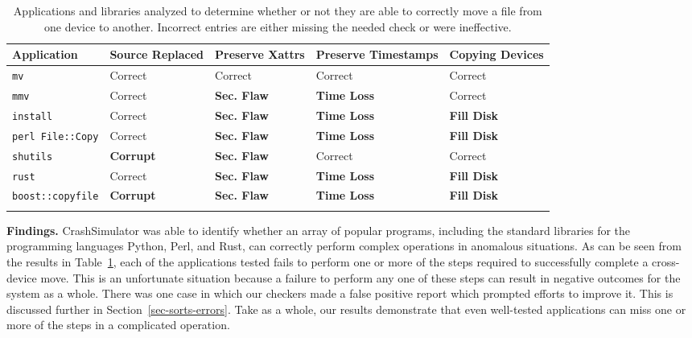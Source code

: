  \begin{table}[t]
    \scriptsize{}
    \begin{tabular}{l p{1cm} p{1cm} p{1.2cm} p{1cm}}
    \toprule{}
        Application     & Source Replaced & Preserve Xattrs & Preserve Timestamps & Copying Devices\\
\hline
        {\tt mv}              & Correct             & Correct         & Correct             & Correct\\
        {\tt mmv}             & Correct             & {\bf Sec. Flaw} & {\bf Time Loss} & Correct\\
        {\tt install}         & Correct             & {\bf Sec. Flaw} & {\bf Time Loss} & {\bf Fill Disk} \\
        {\tt perl File::Copy} & Correct             & {\bf Sec. Flaw} & {\bf Time Loss} & {\bf Fill Disk} \\
        {\tt shutils}         & {\bf Corrupt}	& {\bf Sec. Flaw} 	& Correct             & Correct\\
        {\tt rust}             & Correct             & {\bf Sec. Flaw} & {\bf Time Loss} & {\bf Fill Disk} \\
        {\tt boost::copyfile} & {\bf Corrupt}	      & {\bf Sec. Flaw} & {\bf Time Loss} & {\bf Fill Disk} \\
    \bottomrule{}
    \end{tabular}
    \caption{Applications and libraries analyzed to determine whether or not
      they are able to correctly move a file from one device to another.
Incorrect entries are either missing the needed check or were ineffective.}
    \label{table:crossdevice}
\end{table}

{\bf Findings.}
CrashSimulator was able to identify whether an array of popular programs,
including the standard libraries for the programming languages Python,
Perl,
and Rust,
can correctly perform complex
operations in anomalous situations.
As can be seen from the results in Table~\ref{table:crossdevice}, each of the
applications tested fails to perform one or more of the steps required to
successfully complete a cross-device move.  This is an unfortunate situation
because a failure to perform any one of these steps can result in negative
outcomes for the system as a whole.  There was one case in which our
checkers made a false positive report which prompted efforts to improve it.
This is discussed further in
Section~\ref{sec-sorts-errors}.
Take as a whole, our results demonstrate that even well-tested applications
can miss one or more of the steps in a complicated operation.

